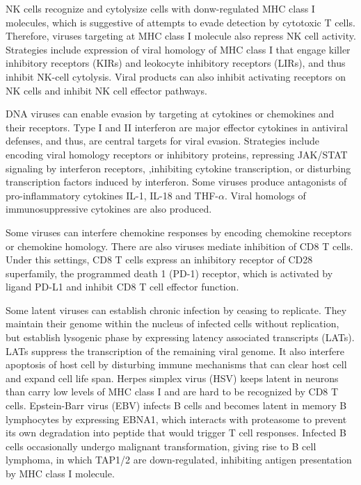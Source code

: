 \documentclass[11pt]{article}
\begin{document}
\begin{sloppypar}
\par

NK cells recognize and cytolysize cells with donw-regulated MHC class I molecules, which is suggestive of attempts to evade detection by cytotoxic T cells. 
Therefore, viruses targeting at MHC class I molecule also repress NK cell activity. 
Strategies include expression of viral homology of MHC class I that engage killer inhibitory receptors (KIRs) and leokocyte inhibitory receptors (LIRs), and thus inhibit NK-cell cytolysis. 
Viral products can also inhibit activating receptors on NK cells and inhibit NK cell effector pathways. 

\par

DNA viruses can enable evasion by targeting at cytokines or chemokines and their receptors. 
Type I and II interferon are major effector cytokines in antiviral defenses, and thus, are central targets for viral evasion. 
Strategies include encoding viral homology receptors or inhibitory proteins, repressing JAK/STAT signaling by interferon receptors, ,inhibiting cytokine transcription, or disturbing transcription factors induced by interferon. 
Some viruses produce antagonists of pro-inflammatory cytokines IL-1, IL-18 and THF-$\alpha$. 
Viral homologs of immunosuppressive cytokines are also produced. 

\par

Some viruses can interfere chemokine responses by encoding chemokine receptors or chemokine homology. 
There are also viruses mediate inhibition of CD8 T cells. 
Under this settings, CD8 T cells express an inhibitory receptor of CD28 superfamily, the programmed death 1 (PD-1) receptor, which is activated by ligand PD-L1 and inhibit CD8 T cell effector function. 

\par

Some latent viruses can establish chronic infection by ceasing to replicate. 
They maintain their genome within the nucleus of infected cells without replication, but establish lysogenic phase by expressing latency associated transcripts (LATs). 
LATs suppress the transcription of the remaining viral genome. 
It also interfere apoptosis of host cell by disturbing immune mechanisms that can clear host cell and expand cell life span. 
Herpes simplex virus (HSV) keeps latent in neurons than carry low levels of MHC class I and are hard to be recognized by CD8 T cells. 
Epstein-Barr virus (EBV) infects B cells and becomes latent in memory B lymphocytes by expressing EBNA1, which interacts with proteasome to prevent its own degradation into peptide that would trigger T cell responses. 
Infected B cells occasionally undergo malignant transformation, giving rise to B cell lymphoma, in which TAP1/2 are down-regulated, inhibiting antigen presentation by MHC class I molecule. 


\end{sloppypar}
\end{document}
